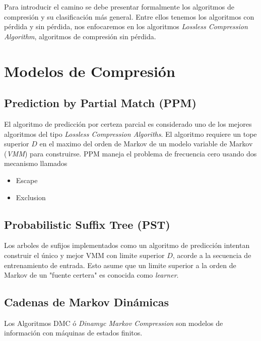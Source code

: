 Para introducir el camino se debe presentar formalmente los algoritmos de compresión y su clasificación más general. Entre ellos tenemos los algoritmos con pérdida y sin pérdida, nos enfocaremos en los algoritmos \emph{Lossless Compression Algorithm}, algoritmos de compresión sin pérdida.









\section{Modelos de Compresión}
 
 \subsection{Prediction by Partial Match (PPM)}
 
	El algoritmo de predicción por certeza parcial es considerado uno de los mejores algoritmos del tipo \emph{Lossless Compression Algoriths}. El algoritmo requiere un tope superior $D$ en el maximo del orden de Markov de un modelo variable de Markov (\emph{VMM}) para construirse. 
	PPM maneja el problema de frecuencia cero usando dos mecanismo  llamados
	
	\begin{itemize}
		\item Escape
		\item Exclusion
	\end{itemize}
	


 \subsection{Probabilistic Suffix Tree (PST)}
 
 Los arboles de sufijos implementados como un algoritmo de predicción intentan construir el único y mejor VMM con limite superior $D$, acorde a la secuencia de entrenamiento de entrada. Esto asume que un limite superior a la orden de Markov de un "fuente certera" es conocida como \emph{learner}.
 
 
 
 \subsection{Cadenas de Markov Dinámicas}
 
 
 Los Algoritmos DMC ó \emph{Dinamyc Markov Compression} son modelos de información con máquinas de estados finitos. 
 
 

\nocite{*}
